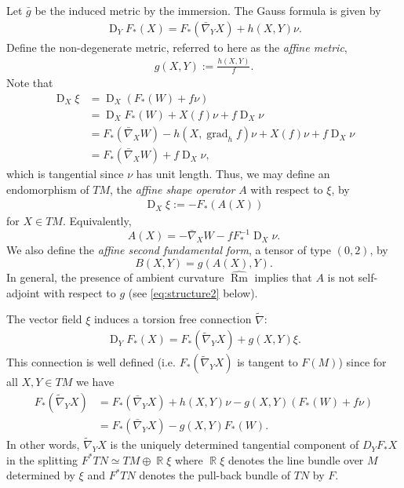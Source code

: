 \documentclass{amsart}
\theoremstyle{definition}
\theoremstyle{remark}
\DeclareMathOperator{\grad}{grad}
\DeclareMathOperator{\Rm}{Rm}
\DeclareMathOperator{\D}{D}
\DeclareMathOperator{\RR}{\mathbb{R}}
\numberwithin{equation}{section}
\begin{document}
Let $\bar{g}$ be the induced metric by the immersion. The Gauss formula is given by
\begin{align}\label{gauss equ}
\D_YF_{\ast}(X)=F_{\ast}(\bar{\nabla}_YX)+h(X,Y)\nu.
\end{align}
Define the non-degenerate metric, referred to here as the \emph{affine metric},
\begin{align}
g(X,Y):=\frac{h(X,Y)}{ f }.
\end{align}
Note that
\begin{align*}
\D_X \xi &= \D_X (F_{\ast}(W) + f \nu) \\
&= \D_X F_{\ast}(W) + X(f)\nu + f \D_X \nu \\
&= F_{\ast}(\bar{\nabla}_X W) - h(X, \grad_h f) \nu + X(f) \nu + f \D_X \nu \\
&= F_{\ast} (\bar{\nabla}_X W) + f \D_X \nu,
\end{align*}
which is tangential since $\nu$ has unit length. Thus, we may define an endomorphism of $TM$, the \emph{affine shape operator} $A$ with respect to $\xi$, by
\begin{align}
\D_X\xi := -F_{\ast}(A(X))
\end{align}
for $X\in TM$. Equivalently,
\[
A(X) =- \bar{\nabla}_X W - f F_{\ast}^{-1} \D_X \nu.
\]
We also define the \emph{affine second fundamental form}, a tensor of type $(0, 2)$, by
\[
B(X, Y) = g(A(X), Y).
\]
In general, the presence of ambient curvature $\widehat{\Rm}$ implies that $A$ is not self-adjoint with respect to $g$ (see \eqref{eq:structure2} below).

The vector field $\xi$ induces a torsion free connection $\tilde{\nabla}$:
\begin{align}\label{gauss equ2}
\D_YF_{\ast}(X)=F_{\ast}(\tilde{\nabla}_YX)+g(X,Y)\xi.
\end{align}
This connection is well defined (i.e. $F_{\ast}(\tilde{\nabla}_Y X)$ is tangent to $F(M)$) since for all $X,Y\in TM$ we have
\begin{align}
F_{\ast}(\tilde{\nabla}_Y X) &= F_{\ast}(\bar{\nabla}_Y X) + h(X, Y) \nu - g(X, Y) (F_{\ast}(W) + f \nu) \\
&= F_{\ast}(\bar{\nabla}_YX)-g(X,Y)F_{\ast}(W) \nonumber.
\end{align}
In other words, $\tilde{\nabla}_Y X$ is the uniquely determined tangential component of $D_Y F_{\ast} X$ in the splitting $F^{\ast} TN \simeq TM \oplus \RR \xi$ where $\RR\xi$ denotes the line bundle over $M$ determined by $\xi$ and $F^{\ast} TN$ denotes the pull-back bundle of $TN$ by $F$.
\end{document}
